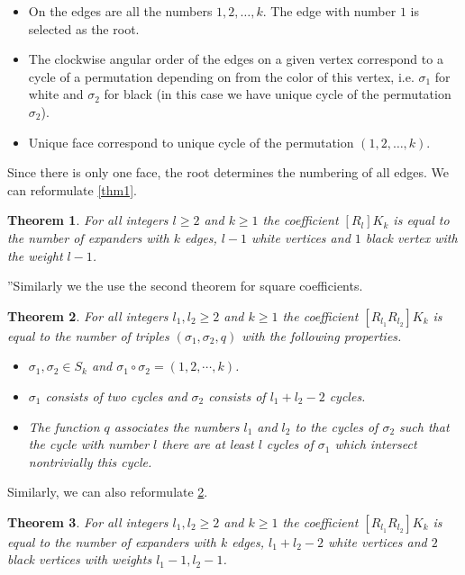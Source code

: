 \documentclass[submission]{FPSAC2021}
\newtheorem{theorem}{Theorem}
\begin{document}
\begin{itemize}

\item On the edges are all the 
numbers $1, 2, \dots, k$.
The edge with number $1$ is selected as the root.

\item The clockwise angular order of the edges on 
a given vertex correspond to a cycle of a permutation
depending on from the color of this vertex, i.e. 
$\sigma_1$ for white and $\sigma_2$ for black
(in this case we have unique cycle of 
the permutation $\sigma_2$). 

\item Unique face correspond to unique cycle of 
the permutation $(1, 2, \ldots, k)$.

\end{itemize}
Since there is only one face, the root determines the 
numbering of all edges. We can reformulate \cref{thm1}.
\begin{theorem}
\label{thm2}
For all integers $l\geq2$ and $k\geq 1$ the 
coefficient $[R_l] K_k$ is equal to the number 
of expanders with $k$ edges, $l-1$ white vertices 
and $1$ black vertex with the weight $l-1$.
\end{theorem}
”Similarly we the use the second theorem for square coefficients.
\begin{theorem}
\label{thm3}
For all integers $l_1, l_2\geq 2$ and $k\geq 1$ 
the coefficient $[R_{l_1} R_{l_2}] K_k$ is equal 
to the number of triples $(\sigma_1, \sigma_2, q)$ 
with the following properties.
\begin{itemize}

\item $\sigma_1, \sigma_2 \in S_k$ 
and $\sigma_1\circ\sigma_2=(1,2,\cdots, k)$.

\item $\sigma_1$ consists of two cycles and 
$\sigma_2$ consists of $l_1+l_2-2$ cycles.

\item The function $q$ associates the numbers 
$l_1$ and $l_2$ to the cycles of $\sigma_2$ 
such that the cycle with number $l$ there are 
at least $l$ cycles of $\sigma_1$ which 
intersect nontrivially this cycle.
\end{itemize}
\end{theorem}
Similarly, we can also reformulate  \cref{thm3}.
\begin{theorem}
\label{thm4}
For all integers $l_1, l_2\geq 2$ and $k\geq 1$ 
the coefficient $[R_{l_1} R_{l_2}] K_k$ is equal 
to the number of expanders with $k$ edges, 
$l_1+l_2-2$ white vertices and $2$ black 
vertices with weights $l_1-1, l_2-1$.
\end{theorem}
\end{document}
